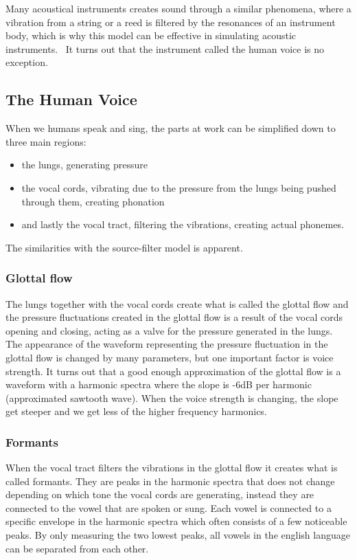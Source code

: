 \documentclass{article}
\begin{document}
Many acoustical instruments creates sound through a similar phenomena, where a vibration from a string or a reed is filtered by the resonances of an instrument body, which is why this model can be effective in simulating acoustic instruments.~\cite{ternstrom7:20} It turns out that the instrument called the human voice is no exception.~\cite{ternstrom8:20}

\subsection{The Human Voice}
When we humans speak and sing, the parts at work can be simplified down to three main regions:~\cite{ternstrom8:20, hall:91}
\begin{itemize}
\item the lungs, generating pressure
\item the vocal cords, vibrating due to the pressure from the lungs being pushed through them, creating phonation
\item and lastly the vocal tract, filtering the vibrations, creating actual phonemes.
\end{itemize}

The similarities with the source-filter model is apparent.

\subsubsection{Glottal flow}
The lungs together with the vocal cords create what is called the glottal flow and the pressure fluctuations created in the glottal flow is a result of the vocal cords opening and closing, acting as a valve for the pressure generated in the lungs. The appearance of the waveform representing the pressure fluctuation in the glottal flow is changed by many parameters, but one important factor is voice strength. It turns out that a good enough approximation of the glottal flow is a waveform with a harmonic spectra where the slope is -6dB per harmonic (approximated sawtooth wave). When the voice strength is changing, the slope get steeper and we get less of the higher frequency harmonics.~\cite{ternstrom8:20, hall:91}

\subsubsection{Formants}
When the vocal tract filters the vibrations in the glottal flow it creates what is called formants. They are peaks in the harmonic spectra that does not change depending on which tone the vocal cords are generating, instead they are connected to the vowel that are spoken or sung. Each vowel is connected to a specific envelope in the harmonic spectra which often consists of a few noticeable peaks. By only measuring the two lowest peaks, all vowels in the english language can be separated from each other.~\cite{ternstrom8:20, hall:91}
\end{document}
